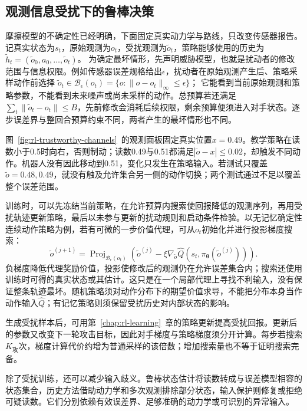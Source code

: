 \subsection{观测信息受扰下的鲁棒决策}
\label{sec:rl-trustworthy-observation}

摩擦模型的不确定性已经明确，下面固定真实动力学与路线，只改变传感器报告。记真实状态为$s_t$，原始观测为$o_t$，受扰观测为$\widetilde o_t$，策略能够使用的历史为
$\widetilde h_t=(\widetilde o_0,a_0,\ldots,\widetilde o_t)$。
为确定最坏情形，先声明威胁模型，也就是扰动者的修改范围与信息权限。例如传感器误差规格给出$\epsilon$，扰动者在原始观测产生后、策略采样动作前选择
$\widetilde o_t\in\mathcal B_\epsilon(o_t)=\{o:\lVert o-o_t\rVert_\infty\leq\epsilon\}$；
它能看到当前原始观测和策略参数，不能看到未来噪声或尚未采样的动作。总预算若还满足$\sum_t\lVert\widetilde o_t-o_t\rVert\leq B$，先前修改会消耗后续权限，剩余预算便须进入对手状态。逐步误差界与整回合预算约束不同，两者产生的最坏情形也不同。

图~\ref{fig:rl-trustworthy-channels}~的观测面板固定真实位置$x=0.49$。教学策略在读数小于0.5时向右，否则制动；读数0.49与0.51都满足$|\widetilde o-x|\leq0.02$，却触发不同动作。机器人没有因此移动到0.51，变化只发生在策略输入。若测试只覆盖$\widetilde o=0.48,0.49$，就没有触及允许集合另一侧的动作切换；两个测试通过不足以覆盖整个误差范围。

训练时，可以先冻结当前策略，在允许预算内搜索使回报降低的观测序列，再用受扰轨迹更新策略，最后以未参与更新的扰动规则和启动条件检验。以无记忆确定性连续动作策略为例，若有可微的一步价值代理，可从$o_t$初始化并进行投影梯度搜索：
\[
  \widetilde o^{(j+1)}
   =\operatorname{Proj}_{\mathcal B_\epsilon(o_t)}
      \left(\widetilde o^{(j)}
       -\xi\nabla_{\widetilde o}
          \widehat Q(s_t,\pi_{\bm{\theta}}(\widetilde o^{(j)}))\right).
\]
负梯度降低代理奖励价值，投影使修改后的观测仍在允许误差集合内；搜索还使用训练时可得的真实状态或其估计。这只是在一个局部代理上寻找不利输入，没有保证整条轨迹最坏。随机策略须对动作分布下的期望价值求导，不能把分布本身当作动作输入$\widehat Q$；有记忆策略则须保留受扰历史对内部状态的影响。

生成受扰样本后，可用第~\ref{chap:rl-learning}~章的策略更新提高受扰回报。更新后的参数又改变下一轮攻击目标，因此对手梯度与策略梯度须分开计算。每步若搜索$K_{\text{攻}}$次，梯度计算代价约增为普通采样的该倍数；增加搜索量也不等于证明搜索完备。

除了受扰训练，还可以减少输入歧义。鲁棒状态估计将读数转成与误差模型相容的状态集合，历史方法借助动力学和多次观测排除部分状态，输入保护则修复或拒绝可疑读数。它们分别依赖有效误差界、足够准确的动力学或可识别的异常输入。

